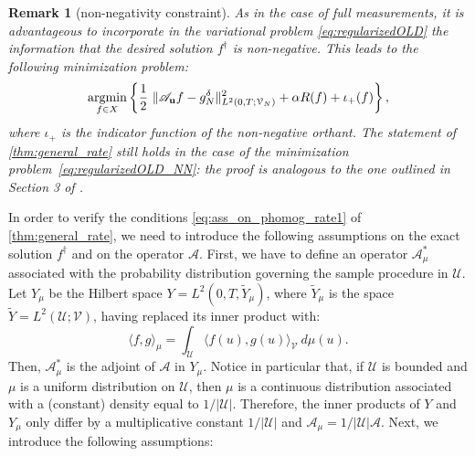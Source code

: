 \documentclass[11pt,a4paper]{article}
\numberwithin{equation}{section}
\newtheorem{remark}{Remark}[section]
\DeclareMathOperator*{\argmin}{argmin}
\newcommand{\bu}{{\bf u}}
\newcommand{\cAbu}{\mathscr{A}_{\bu}}
\newcommand{\cA}{\mathscr{A}}
\newcommand{\cAm}{\mathscr{A}_\mu}
\begin{document}
\begin{remark}[non-negativity constraint]
As in the case of full measurements, it is advantageous to incorporate in the variational problem  \eqref{eq:regularizedOLD} the information that the desired solution $f^\dag$ is non-negative. This leads to the following minimization problem:
\begin{equation}\label{eq:regularizedOLD_NN}
\argmin_{f \in X} \left\{
\frac{1}{2} \ \| \cAbu f 
    - g_N^{\delta}\|^2_{L^2(0,T; \mathcal{V}_N)} + \alpha R(f)+ \iota_+(f)
\right\},
\end{equation}
where $\iota_+$ is the indicator function of the non-negative orthant.
The statement of \cref{thm:general_rate} still holds in the case of the minimization problem~\eqref{eq:regularizedOLD_NN}: the proof is analogous to the one outlined in Section 3 of \cite{Bubba22}.
\end{remark}

In order to verify the conditions \eqref{eq:ass_on_phomog_rate1} of \cref{thm:general_rate}, we need to introduce the following assumptions on the exact solution $f^\dag$ and on the operator $\cA$. First, we have to define an operator $\cAm^*$ associated with the probability distribution governing the sample procedure in $\mathcal{U}$. Let $Y_\mu$ be the Hilbert space $Y = L^2(0,T,\tilde{Y}_\mu)$, where $\tilde{Y}_\mu$ is the space $\tilde{Y} = L^2(\mathcal{U};\mathcal{V})$, having replaced its inner product with:
\[
\langle f, g \rangle_\mu = \int_{\mathcal{U}} \langle f(u),g(u)\rangle_{\mathcal{V}}\ d\mu(u).
\]
Then, $\cAm^*$ is the adjoint of $\cA$ in $Y_\mu$. Notice in particular that, if $\mathcal{U}$ is bounded and $\mu$ is a uniform distribution on $\mathcal{U}$, 
 then $\mu$ is a continuous distribution associated with a (constant) density equal to $1/|\mathcal{U}|$. Therefore, the inner products of $Y$ and $Y_\mu$ only differ by a multiplicative constant $1/|\mathcal{U}|$ and $\cAm = 1/|\mathcal{U}| \cA$. 
Next, we introduce the following assumptions:
\end{document}

